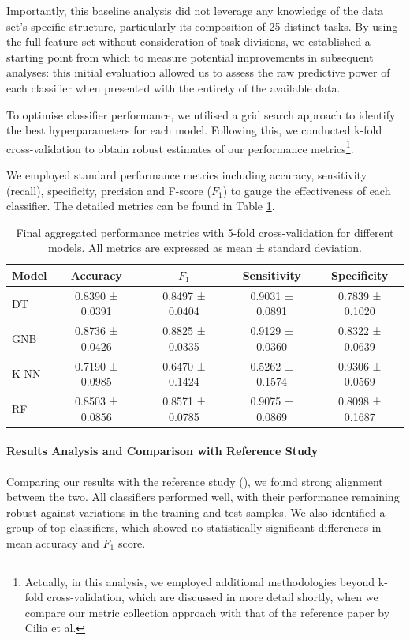 \documentclass[a4paper, 11pt]{article}
\begin{document}
Importantly, this baseline analysis did not leverage any knowledge of the data set's specific structure, particularly its composition of 25 distinct tasks. By using the full feature set without consideration of task divisions, we established a starting point from which to measure potential improvements in subsequent analyses: this initial evaluation allowed us to assess the raw predictive power of each classifier when presented with the entirety of the available data.

To optimise classifier performance, we utilised a grid search approach to identify the best hyperparameters for each model. Following this, we conducted k-fold cross-validation to obtain robust estimates of our performance metrics\footnote{Actually, in this analysis, we employed additional methodologies beyond k-fold cross-validation, which are discussed in more detail shortly, when we compare our metric collection approach with that of the reference paper by Cilia et al.}.

We employed standard performance metrics including accuracy, sensitivity (recall), specificity, precision and F-score ($F_1$) to gauge the effectiveness of each classifier. The detailed metrics can be found in Table \ref{table:baseline-metrics}.

\begin{table}[h!]
\centering
\scriptsize
\begin{tabular}{lcccc}
\toprule
\textbf{Model} & \textbf{Accuracy} & \textbf{$F_1$} & \textbf{Sensitivity} & \textbf{Specificity} \\
\midrule
DT & 0.8390 ± 0.0391 & 0.8497 ± 0.0404 & 0.9031 ± 0.0891 & 0.7839 ± 0.1020 \\
GNB & 0.8736 ± 0.0426 & 0.8825 ± 0.0335 & 0.9129 ± 0.0360 & 0.8322 ± 0.0639 \\
K-NN & 0.7190 ± 0.0985 & 0.6470 ± 0.1424 & 0.5262 ± 0.1574 & 0.9306 ± 0.0569 \\
RF & 0.8503 ± 0.0856 & 0.8571 ± 0.0785 & 0.9075 ± 0.0869 & 0.8098 ± 0.1687 \\
\bottomrule
\end{tabular}
\caption{\footnotesize Final aggregated performance metrics with 5-fold cross-validation for different models. All metrics are expressed as mean ± standard deviation.}
\label{table:baseline-metrics}
\end{table}

\vspace{-20pt}

\paragraph{Results Analysis and Comparison with Reference Study}
Comparing our results with the reference study (\cite{Cilia2022}), we found strong alignment between the two. All classifiers performed well, with their performance remaining robust against variations in the training and test samples. We also identified a group of top classifiers, which showed no statistically significant differences in mean accuracy and $F_1$ score.
\end{document}
